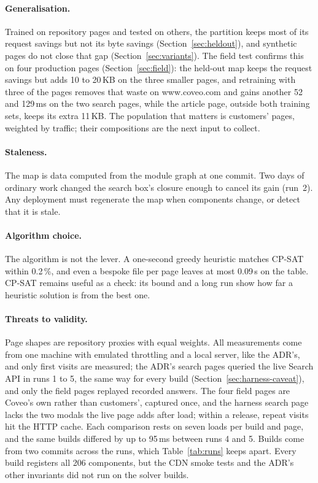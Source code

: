 \documentclass[11pt]{article}
\begin{document}
\paragraph{Generalisation.} Trained on repository pages and tested on others, the partition keeps most of its request savings but not its byte savings (Section~\ref{sec:heldout}), and synthetic pages do not close that gap (Section~\ref{sec:variants}). The field test confirms this on four production pages (Section~\ref{sec:field}): the held-out map keeps the request savings but adds 10 to 20\,KB on the three smaller pages, and retraining with three of the pages removes that waste on www.coveo.com and gains another 52 and 129\,ms on the two search pages, while the article page, outside both training sets, keeps its extra 11\,KB. The population that matters is customers' pages, weighted by traffic; their compositions are the next input to collect.

\paragraph{Staleness.} The map is data computed from the module graph at one commit. Two days of ordinary work changed the search box's closure enough to cancel its gain (run~2). Any deployment must regenerate the map when components change, or detect that it is stale.

\paragraph{Algorithm choice.} The algorithm is not the lever. A one-second greedy heuristic matches CP-SAT within 0.2\,\%, and even a bespoke file per page leaves at most 0.09\,s on the table. CP-SAT remains useful as a check: its bound and a long run show how far a heuristic solution is from the best one.

\paragraph{Threats to validity.} Page shapes are repository proxies with equal weights. All measurements come from one machine with emulated throttling and a local server, like the ADR's, and only first visits are measured; the ADR's search pages queried the live Search API in runs 1 to 5, the same way for every build (Section~\ref{sec:harness-caveat}), and only the field pages replayed recorded answers. The four field pages are Coveo's own rather than customers', captured once, and the harness search page lacks the two modals the live page adds after load; within a release, repeat visits hit the HTTP cache. Each comparison rests on seven loads per build and page, and the same builds differed by up to 95\,ms between runs 4 and 5. Builds come from two commits across the runs, which Table~\ref{tab:runs} keeps apart. Every build registers all 206 components, but the CDN smoke tests and the ADR's other invariants did not run on the solver builds.
\end{document}
